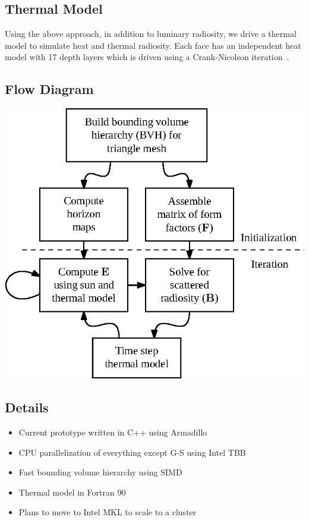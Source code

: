 \documentclass[final,paperwidth=36in,paperheight=45in]{baposter}
\begin{document}
\begin{poster}
{    \subsection*{Thermal Model}

    \vspace{-1em}

    Using the above approach, in addition to luminary radiosity, we
    drive a thermal model to simulate heat and thermal radiosity. Each
    face has an independent heat model with 17 depth layers which is
    driven using a Crank-Nicolson iteration~\cite{schorghofer-pcc}.  }

  {
    \subsection*{Flow Diagram}
    \begin{center}
      \includegraphics[width=\linewidth]{flow-diagram.eps}
    \end{center}

    \vspace{-4em}

    \subsection*{Details}
    \begin{itemize}[noitemsep]
    \item Current prototype written in C++ using Armadillo
    \item CPU parallelization of everything except G-S using Intel TBB
    \item Fast bounding volume hierarchy using SIMD
    \item Thermal model in Fortran 90~\cite{schorghofer-pcc}
    \item Plans to move to Intel MKL to scale to a cluster
    \end{itemize}
  }


\end{poster}
\end{document}
